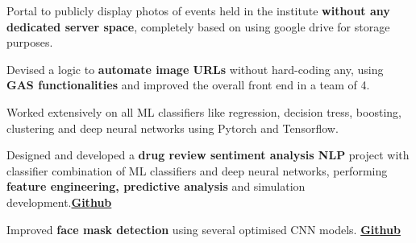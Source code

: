 \documentclass{deedy-resume-openfont}
\begin{document}
\begin{minipage}[t]{0.66\textwidth}
\begin{tightemize}
{\justifying

\item Portal to publicly display photos of events held in the institute \textbf{without any dedicated server space}, completely based on using google drive for storage purposes.

\item Devised a logic to \textbf{automate image URLs} without hard-coding any, using \textbf{GAS functionalities} and improved the overall front end in a team of 4.

\par}
\end{tightemize}
\sectionsep

\location{}
\begin{tightemize}
{\justifying
\item Worked extensively on all ML classifiers like regression, decision tress, boosting, clustering and deep neural networks using Pytorch and Tensorflow.

\item Designed and developed a \textbf{drug review sentiment analysis NLP} project with classifier combination of ML classifiers and deep neural networks, performing \textbf{feature engineering, predictive analysis} and simulation development.\href{https://github.com/harsh-ux/Sentiment-Analysis-of-Drug-Reviews}{\textbf{Github }}\href{https://github.com/harsh-ux/Sentiment-Analysis-of-Drug-Reviews}{\faExternalLink}

\item Improved \textbf{face mask detection} using several optimised CNN models. \href{https://github.com/gaditi123/mask_detection}{\textbf{Github }}\href{https://github.com/gaditi123/mask_detection}{\faExternalLink}

\par}
\end{tightemize}
\sectionsep




\end{minipage}
\end{document}
